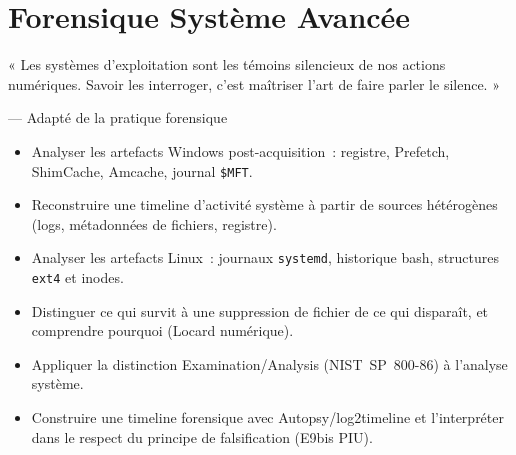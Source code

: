 
\chapter{Forensique Système Avancée}
\label{chap:for-sys}

\epigraph{%
    « Les systèmes d'exploitation sont les témoins silencieux de nos
    actions numériques. Savoir les interroger, c'est maîtriser l'art
    de faire parler le silence. »%
}{--- Adapté de la pratique forensique}


\begin{boxobjectifs}
\begin{itemize}
    \item Analyser les artefacts Windows post-acquisition~: registre,
          Prefetch, ShimCache, Amcache, journal \texttt{\$MFT}.
    \item Reconstruire une timeline d'activité système à partir de
          sources hétérogènes (logs, métadonnées de fichiers, registre).
    \item Analyser les artefacts Linux~: journaux \texttt{systemd},
          historique bash, structures \texttt{ext4} et inodes.
    \item Distinguer ce qui survit à une suppression de fichier de ce
          qui disparaît, et comprendre pourquoi (Locard numérique).
    \item Appliquer la distinction Examination/Analysis (NIST~SP~800-86)
          à l'analyse système.
    \item Construire une timeline forensique avec Autopsy/log2timeline
          et l'interpréter dans le respect du principe de falsification
          (E9bis PIU).
\end{itemize}
\end{boxobjectifs}

